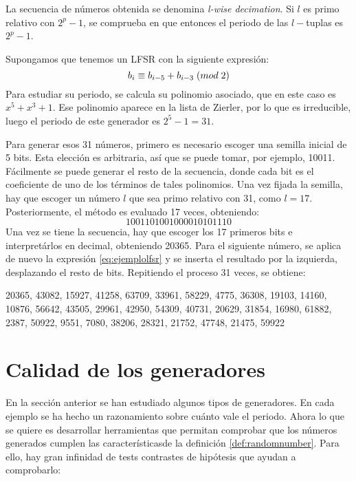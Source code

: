 La secuencia de números obtenida se denomina \textit{l-wise decimation}. Si $l$ es primo relativo con $2^p-1$, se comprueba en \cite{gentle2006random} que entonces el periodo de las $l-$tuplas es $2^p-1$.

\begin{example}\label{example:lfsrg}
Supongamos que tenemos un LFSR con la siguiente expresión:
\begin{equation}\label{eq:ejemplolfsr}
b_i \equiv b_{i-5}+b_{i-3} \;(mod \; 2)
\end{equation}
Para estudiar su periodo, se calcula su polinomio asociado, que en este caso es  $x^5+x^3+1$. Ese polinomio aparece en la lista de Zierler, por lo que es irreducible, luego el periodo de este generador es $2^5-1=31$.

Para generar esos 31 números, primero es necesario escoger una semilla inicial de 5 bits. Esta elección es arbitraria, así que se puede tomar, por ejemplo, 10011. Fácilmente se puede generar el resto de la secuencia, donde cada bit es el coeficiente de uno de los términos de tales polinomios. Una vez fijada la semilla, hay que escoger un número $l$ que sea primo relativo con 31, como $l=17$. Posteriormente, el método es evaluado 17 veces, obteniendo:
\[
1001101001000010101110
\]
Una vez se tiene la secuencia, hay que escoger los 17 primeros bits e interpretárlos en decimal, obteniendo 20365. Para el siguiente número, se aplica de nuevo la expresión \ref{eq:ejemplolfsr} y se inserta el resultado por la izquierda, desplazando el resto de bits. Repitiendo el proceso 31 veces, se obtiene:
\begin{center}
20365, 43082, 15927, 41258, 63709, 33961, 58229, 4775, 36308, 19103, 14160, 10876, 56642, 43505, 29961, 42950, 54309, 40731, 20629, 31854, 16980, 61882, 2387, 50922, 9551, 7080, 38206, 28321, 21752, 47748, 21475, 59922
\end{center}
\end{example}


\section{Calidad de los generadores}

En la sección anterior se han estudiado algunos tipos de generadores. En cada ejemplo se ha hecho un razonamiento sobre cuánto vale el periodo. Ahora lo que se quiere es desarrollar herramientas que permitan comprobar que los números generados cumplen las característicasde la definición \ref{def:randomnumber}. Para ello, hay gran infinidad de tests contrastes de hipótesis que ayudan a comprobarlo:

